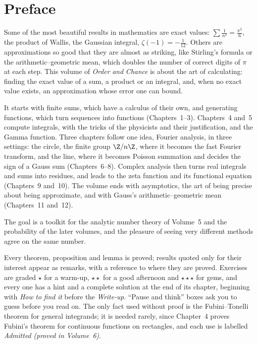 \chapter*{Preface}
Some of the most beautiful results in mathematics are exact values: $\sum\frac1{n^2}=\frac{\pi^2}6$, the product of
Wallis, the Gaussian integral, $\zeta(-1)=-\frac1{12}$. Others are approximations so good that they are almost as
striking, like Stirling's formula or the arithmetic--geometric mean, which doubles the number of correct digits of
$\pi$ at each step. This volume of \emph{Order and Chance} is about the art of calculating: finding the exact value of
a sum, a product or an integral, and, when no exact value exists, an approximation whose error one can bound.

It starts with finite sums, which have a calculus of their own, and generating functions, which turn sequences into
functions (Chapters~1--3). Chapters~4 and~5 compute integrals, with the tricks of the physicists and their
justification, and the Gamma function. Three chapters follow one idea, Fourier analysis, in three settings: the
circle, the finite group $\Z/n\Z$, where it becomes the fast Fourier transform, and the line, where it becomes Poisson
summation and decides the sign of a Gauss sum (Chapters~6--8). Complex analysis then turns real integrals and sums into
residues, and leads to the zeta function and its functional equation (Chapters~9 and~10). The volume ends with
asymptotics, the art of being precise about being approximate, and with Gauss's arithmetic--geometric mean
(Chapters~11 and~12).

The goal is a toolkit for the analytic number theory of Volume~5 and the probability of the later volumes, and the
pleasure of seeing very different methods agree on the same number.

Every theorem, proposition and lemma is proved; results quoted only for their interest appear as remarks, with a
reference to where they are proved. Exercises are graded \textbf{$\star$} for a warm-up, \textbf{$\star\star$} for a good
afternoon and \textbf{$\star\star\star$} for gems, and every one has a hint and a complete solution at the end of its
chapter, beginning with \emph{How to find it} before the \emph{Write-up}. ``Pause and think'' boxes ask you to guess
before you read on. The only fact used without proof is the Fubini--Tonelli theorem for general integrands; it is needed
rarely, since Chapter~4 proves Fubini's theorem for continuous functions on rectangles, and each use is labelled
\emph{Admitted (proved in Volume~6)}.
